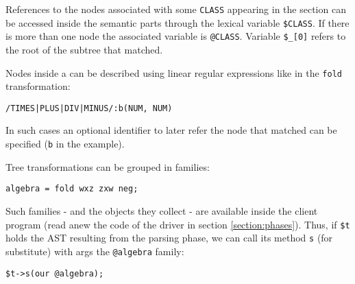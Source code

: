 References to the nodes associated with some
\verb|CLASS| appearing in the 
section can be accessed inside the semantic parts
through the lexical variable \verb|$CLASS|.
If there is more than one node the 
associated variable is \verb|@CLASS|. Variable \verb|$_[0]|
refers to the root of the subtree that matched.

Nodes inside a  can be described using linear
regular expressions like in the \verb|fold| transformation:
\begin{verbatim}
/TIMES|PLUS|DIV|MINUS/:b(NUM, NUM)
\end{verbatim}
In such cases an optional identifier 
to later refer the node that matched 
can be specified (\verb|b| in the example).

Tree transformations can be grouped in families:

\begin{verbatim}
algebra = fold wxz zxw neg;
\end{verbatim}

Such families - and the objects they collect - are 
available inside the client program (read anew the code
of the driver in section \ref{section:phases}). Thus,
if \verb|$t| holds the AST resulting
from the parsing phase, we can call
its method \verb|s| (for substitute)
with args the \verb|@algebra| family:
\begin{verbatim}
$t->s(our @algebra);
\end{verbatim}

